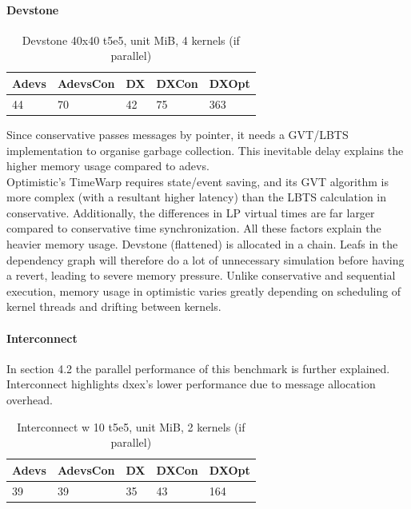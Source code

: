 \paragraph*{Devstone}
\begin{table}[htb]
	\centering
	\caption{Devstone 40x40 t5e5, unit MiB, 4 kernels (if parallel)}
	\label{dtone_mem}
	\begin{tabular}{| l | l | l | l | l |}
		\hline
		Adevs & AdevsCon &DX &DXCon &DXOpt\\ \hline
		44 & 70 & 42 & 75 & 363  \\ \hline
	\end{tabular}
\end{table}
Since conservative passes messages by pointer, it needs a GVT/LBTS implementation to organise garbage collection. This inevitable delay explains the higher memory usage compared to adevs.\\
Optimistic's TimeWarp requires state/event saving, and its GVT algorithm is more complex (with a resultant higher latency) than the LBTS calculation in conservative. 
Additionally, the differences in LP virtual times are far larger compared to conservative time synchronization. All these factors explain the heavier memory usage. Devstone (flattened) is allocated in a chain. Leafs in the dependency graph will therefore do a lot of unnecessary simulation before having a revert, leading to severe memory pressure. Unlike conservative and sequential execution, memory usage in optimistic varies greatly depending on scheduling of kernel threads and drifting between kernels. 
\paragraph*{Interconnect}
In section 4.2 the parallel performance of this benchmark is further explained. Interconnect highlights dxex's lower performance due to message allocation overhead.
\begin{table}[lhtb]
	\centering
	\caption{Interconnect w 10 t5e5, unit MiB, 2 kernels (if parallel)}
	\label{iconn_mem}
	\begin{tabular}{| l | l | l | l | l |}
		\hline
		Adevs & AdevsCon &DX &DXCon & DXOpt\\ \hline
		39 & 39 & 35 & 43 & 164 \\ \hline
	\end{tabular}
\end{table}
		
